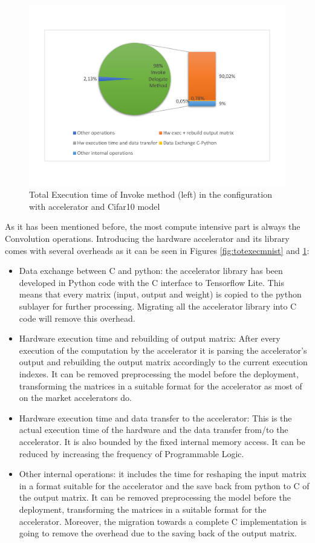 \begin{figure}[!htbp]
\centering
\captionsetup{justification=centering}
\includegraphics[scale=0.55,angle=0]{./figure/graphs/latency_subdivision_cifar10.pdf}
\caption{Total Execution time of Invoke method (left) in the configuration with accelerator and Cifar10 model}
\label{fig:totexeccifar10}
\end{figure}
\newpage
As it has been mentioned before, the most compute intensive part is always the Convolution operations. Introducing the hardware accelerator and its library comes with several overheads as it can be seen in Figures \ref{fig:totexecmnist} and \ref{fig:totexeccifar10}:\\
\begin{itemize}
\item Data exchange between C and python: the accelerator library has been developed in Python code with the C interface to Tensorflow Lite. This means that every matrix (input, output and weight) is copied to the python sublayer for further processing. Migrating all the accelerator library into C code will remove this overhead.
\item Hardware execution time and rebuilding of output matrix: After every execution of the computation by the accelerator it is parsing the accelerator's output and rebuilding the output matrix accordingly to the current execution indexes. It can be removed preprocessing the model before the deployment, transforming the matrices in a suitable format for the accelerator as most of on the market accelerators do.
\item Hardware execution time and data transfer to the accelerator: This is the actual execution time of the hardware and the data transfer from/to the accelerator. It is also bounded by the fixed internal memory access. It can be reduced by increasing the frequency of Programmable Logic.
\item Other internal operations: it includes the time for reshaping the input matrix in a format suitable for the accelerator and the save back from python to C of the output matrix. It can be removed preprocessing the model before the deployment, transforming the matrices in a suitable format for the accelerator. Moreover, the migration towards a complete C implementation is going to remove the overhead due to the saving back of the output matrix.\\
\end{itemize}
